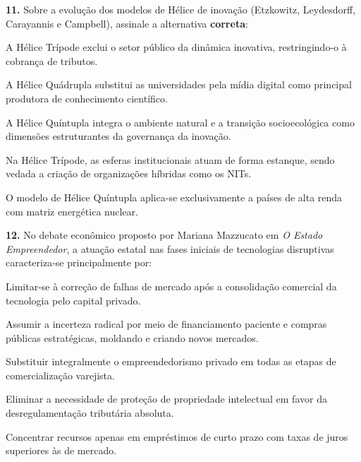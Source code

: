 \textbf{11.} Sobre a evolução dos modelos de Hélice de inovação (Etzkowitz, Leydesdorff, Carayannis e Campbell), assinale a alternativa \textbf{correta}:
\begin{alternativas}
  \item A Hélice Trípode exclui o setor público da dinâmica inovativa, restringindo-o à cobrança de tributos.
  \item A Hélice Quádrupla substitui as universidades pela mídia digital como principal produtora de conhecimento científico.
  \item A Hélice Quíntupla integra o ambiente natural e a transição socioecológica como dimensões estruturantes da governança da inovação.
  \item Na Hélice Trípode, as esferas institucionais atuam de forma estanque, sendo vedada a criação de organizações híbridas como os NITs.
  \item O modelo de Hélice Quíntupla aplica-se exclusivamente a países de alta renda com matriz energética nuclear.
\end{alternativas}

\textbf{12.} No debate econômico proposto por Mariana Mazzucato em \textit{O Estado Empreendedor}, a atuação estatal nas fases iniciais de tecnologias disruptivas caracteriza-se principalmente por:
\begin{alternativas}
  \item Limitar-se à correção de falhas de mercado após a consolidação comercial da tecnologia pelo capital privado.
  \item Assumir a incerteza radical por meio de financiamento paciente e compras públicas estratégicas, moldando e criando novos mercados.
  \item Substituir integralmente o empreendedorismo privado em todas as etapas de comercialização varejista.
  \item Eliminar a necessidade de proteção de propriedade intelectual em favor da desregulamentação tributária absoluta.
  \item Concentrar recursos apenas em empréstimos de curto prazo com taxas de juros superiores às de mercado.
\end{alternativas}

